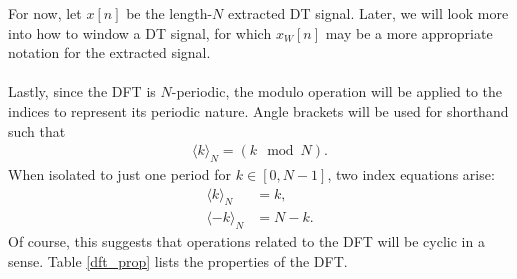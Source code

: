 \documentclass{report}
\begin{document}
\pagebreak
For now, let $x[n]$ be the length-$N$ extracted DT signal. Later, we will look more into how to window a DT signal, for which $x_W[n]$ may be a more appropriate notation for the extracted signal.
\\ \\
Lastly, since the DFT is $N$-periodic, the modulo operation will be applied to the indices to represent its periodic nature. Angle brackets will be used for shorthand such that 
\begin{align}
    \langle k\rangle_N = (k \mod N).
\end{align}
When isolated to just one period for $k\in[0,N-1]$, two index equations arise: 
\begin{align}
    \langle k\rangle_N &= k, \\
    \langle -k\rangle_N &= N-k.
\end{align}
Of course, this suggests that operations related to the DFT will be cyclic in a sense. Table \ref{dft_prop} lists the properties of the DFT.
\end{document}
